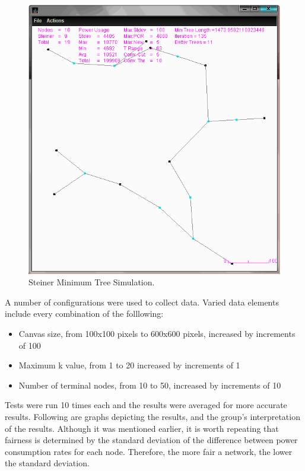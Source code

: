 \begin{figure}[htp]
\includegraphics[scale=0.405]{images/1.PNG}
\caption{Steiner Minimum Tree Simulation.}
\label{1}
\end{figure}

A number of configurations were used to collect data.  Varied data elements include every combination of the folllowing:
\begin{itemize}
\item	Canvas size, from 100x100 pixels to 600x600 pixels, increased by increments of 100 
\item	Maximum k value, from 1 to 20 increased by increments of 1
\item	Number of terminal nodes, from 10 to 50, increased by increments of 10
\end{itemize}

Tests were run 10 times each and the results were averaged for more accurate results.  Following are graphs depicting the results, and the group's interpretation of the results.  Although it was mentioned earlier, it is worth repeating that fairness is determined by the standard deviation of the difference between power consumption rates for each node.  Therefore, the more fair a network, the lower the standard deviation. 

